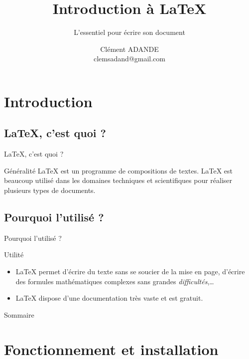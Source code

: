 \documentclass[17pt]{beamer}
\title{Introduction à \LaTeX}
\subtitle{L'essentiel pour écrire son document}
\author[clemsadand@gmail.com]{Clément ADANDE\\ clemsadand@gmail.com}
\institute[IMSP-UAC]{Université d'Abomey-Calavi\\%
		Institut de Mathématiques et des Sciences Physiques
}
\begin{document}
\begin{frame}[plain]
\maketitle
\end{frame}

\section*{Introduction}
\subsection{\LaTeX{}, c'est quoi ?}

\begin{frame}{\LaTeX{}, c'est quoi ? }
\begin{block}{Généralité}
\LaTeX{} est un programme de compositions de textes. \LaTeX{} est beaucoup utilisé dans les domaines techniques et scientifiques pour réaliser plusieurs types de documents.
\end{block}
\end{frame}

\subsection{Pourquoi l'utilisé ?}

\begin{frame}{Pourquoi l'utilisé ?}
\begin{block}{Utilité}
\begin{itemize}
\item \LaTeX{} permet d'écrire du texte sans se soucier de la mise en page, d'écrire des formules mathématiques complexes sans grandes \textit{difficultés},\dots
\item \LaTeX{} dispose d'une documentation très vaste et est gratuit.
\end{itemize}
\end{block}
\end{frame}
\begin{frame}[plain]{Sommaire}
\tableofcontents[hideallsubsections]
\end{frame}

\section{Fonctionnement et installation}
\end{document}
